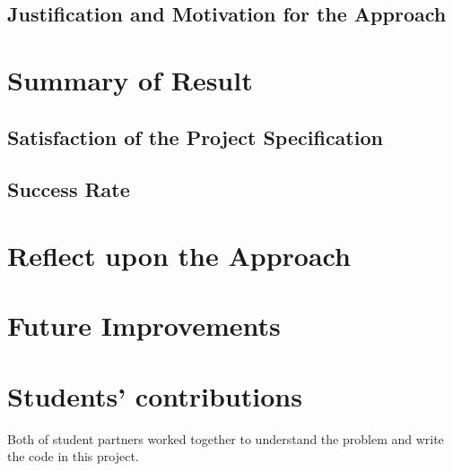 \documentclass[12pt,twoside,letterpaper]{article}
\begin{document}
\clearpage

\subsection{Justification and Motivation for the Approach}
\lipsum
\clearpage

\section{Summary of Result}
\subsection{Satisfaction of the Project Specification}
\subsection{Success Rate}
\clearpage

\section{Reflect upon the Approach}
\lipsum
\clearpage

\section{Future Improvements}
\lipsum
\vfill
\section*{Students' contributions}
Both of student partners worked together to understand the problem and write the code in this project.
\end{document}
